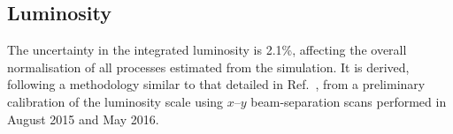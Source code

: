 
\subsection{Luminosity}
\label{sec:syst_lumi}

The uncertainty in the integrated luminosity is 2.1\%, affecting the overall normalisation of
all processes estimated from the simulation. It is derived, following a methodology similar to that detailed in Ref.~\cite{Aaboud:2016hhf}, 
from a preliminary calibration of the luminosity scale using $x$--$y$ beam-separation scans performed in August 2015 and May 2016.

